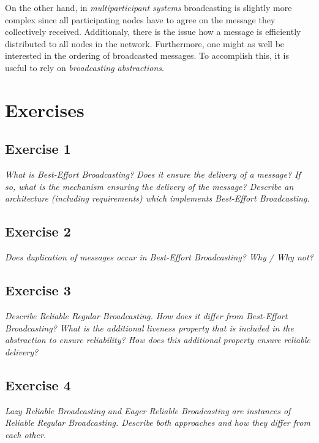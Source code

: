 On the other hand, in \emph{multiparticipant systems} broadcasting is slightly more complex since all participating nodes have to agree on the message they collectively received. Additionaly, there is the issue how a message is efficiently distributed to all nodes in the network. Furthermore, one might as well be interested in the ordering of broadcasted messages. To accomplish this, it is useful to rely on \emph{broadcasting abstractions}.

\section{Exercises}
\label{sec:exercises}

\subsection*{Exercise 1}
\label{sec:exercise_1}

\emph{What is Best-Effort Broadcasting? Does it ensure the delivery of a message? If so, what is the mechanism ensuring the delivery of the message? Describe an architecture (including requirements) which implements Best-Effort Broadcasting.}

\subsection*{Exercise 2}
\label{sec:exercise_2}

\emph{Does duplication of messages occur in Best-Effort Broadcasting? Why / Why not?}

\subsection*{Exercise 3}
\label{sec:exercise_3}

\emph{Describe Reliable Regular Broadcasting. How does it differ from Best-Effort Broadcasting? What is the additional liveness property that is included in the abstraction to ensure reliability? How does this additional property ensure reliable delivery?}

\subsection*{Exercise 4}
\label{sec:exercise_4}

\emph{Lazy Reliable Broadcasting and Eager Reliable Broadcasting are instances of Reliable Regular Broadcasting. Describe both approaches and how they differ from each other.}

